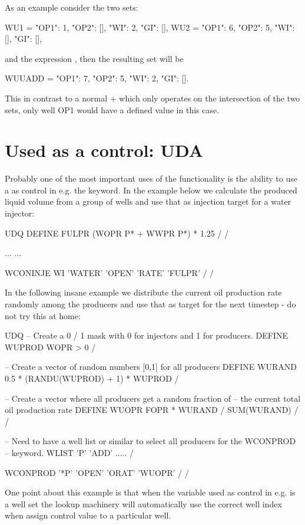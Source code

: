 As an example consider the two sets:
\begin{code}
  WU1     = {"OP1": 1, "OP2": [], "WI": 2,  "GI": []},
  WU2     = {"OP1": 6, "OP2": 5,  "WI": [], "GI": []},
\end{code}

and the \udq{} expression , then the resulting
set  will be
\begin{code}
  WUUADD  = {"OP1": 7, "OP2": 5,  "WI": 2,  "GI": []}.
\end{code}
This in contrast to a normal $+$ which only operates on the intersection of the
two sets, only well OP1 would have a defined value in this case.


\section{Used as a control: UDA}
Probably one of the most important uses of the \udq{} functionality is the
ability to use a \udq{} as control in e.g. the  keyword. In the
example below we calculate the produced liquid volume from a group of wells and
use that as injection target for a water injector:

\begin{deck}
UDQ
  DEFINE FULPR  (WOPR P* + WWPR P*) * 1.25 /
/

...
...

WCONINJE
  WI  'WATER'  'OPEN'  'RATE'   'FULPR' /
/
\end{deck}

In the following insane example we distribute the current oil production rate
randomly among the producers and use that as target for the next timestep - do
not try this at home:
\begin{deck}
UDQ
  -- Create a 0 / 1 mask with 0 for injectors and 1 for producers.
  DEFINE WUPROD WOPR > 0 /
  
  -- Create a vector of random numbers [0,1] for all producers
  DEFINE WURAND 0.5 * (RANDU(WUPROD) + 1) * WUPROD /

  -- Create a vector where all producers get a random fraction of
  -- the current total oil production rate
  DEFINE WUOPR FOPR * WURAND / SUM(WURAND) /
/

-- Need to have a well list or similar to select all producers for the WCONPROD
-- keyword.
WLIST
  'P' 'ADD' ..... /


WCONPROD
 '*P' 'OPEN' 'ORAT'  'WUOPR' /
/
\end{deck}
One point about this example is that when the \udq{} variable used as control in
e.g.  is a well set the lookup machinery will automatically use the
correct well index when assign control value to a particular well.

